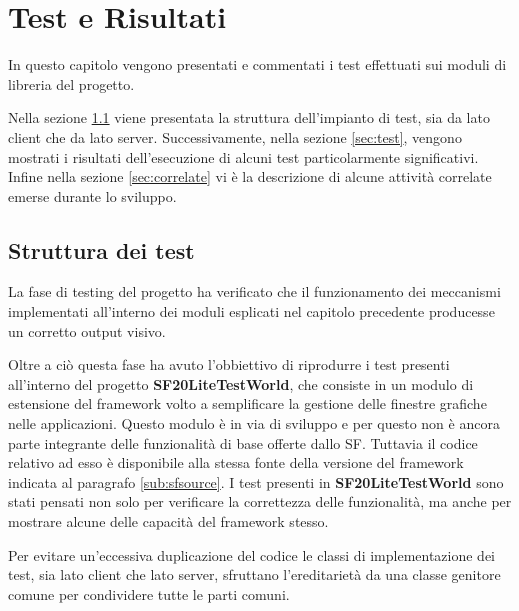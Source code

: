 
\chapter{Test e Risultati}
\label{ch:testerisultati}

In questo capitolo vengono presentati e commentati i test effettuati sui moduli di libreria del progetto.

Nella sezione \ref{sec:strutturatest} viene presentata la struttura dell'impianto di test, sia da lato client che da lato server.
Successivamente, nella sezione \ref{sec:test}, vengono mostrati i risultati dell'esecuzione di alcuni test particolarmente significativi. 
Infine nella sezione \ref{sec:correlate} vi \`e la descrizione di alcune attivit\`a correlate emerse durante lo sviluppo.


\section{Struttura dei test}
\label{sec:strutturatest}
La fase di testing del progetto ha verificato che il funzionamento dei meccanismi implementati all'interno dei moduli esplicati nel capitolo precedente producesse un corretto output visivo.

Oltre a ci\`o questa fase ha avuto l'obbiettivo di riprodurre i test presenti all'interno del progetto \textbf{SF20LiteTestWorld}, che consiste in un modulo di estensione del framework volto a semplificare la gestione delle finestre grafiche nelle applicazioni. Questo modulo \`e in via di sviluppo e per questo non \`e ancora parte integrante delle funzionalit\`a di base offerte dallo \ac{SF}. Tuttavia il codice relativo ad esso \`e disponibile alla stessa fonte della versione del framework indicata al paragrafo \ref{sub:sfsource}.
I test presenti in \textbf{SF20LiteTestWorld} sono stati pensati non solo per verificare la correttezza delle funzionalit\`a, ma anche per mostrare alcune delle capacit\`a del framework stesso.

Per evitare un'eccessiva duplicazione del codice le classi di implementazione dei test, sia lato client che lato server, sfruttano l'ereditariet\`a da una classe genitore comune per condividere tutte le parti comuni.

